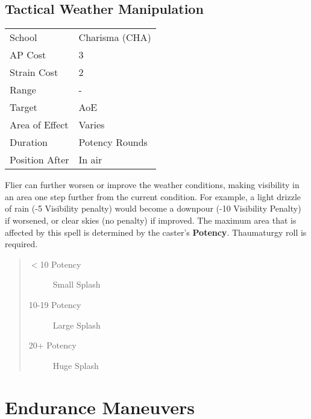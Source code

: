 \documentclass[11pt,a4paper,twocolumn]{book}
\begin{document}
\subsection*{Tactical Weather Manipulation}
{
	\begin{tabu} to 75mm{| X[l,4] | X[l,7] |}
		\hline
		School 			& Charisma (CHA) 	\\
		AP Cost	      	& 3 				\\
		Strain Cost     & 2 				\\
		Range     		& - 				\\
		Target      	& AoE 				\\
		Area of Effect  & Varies 	 		\\
		Duration     	& Potency Rounds	\\
		Position After  & In air 			\\ \hline
	\end{tabu}
	
}

\medskip

Flier can further worsen or improve the weather conditions, making visibility in an area one step further from the current condition. For example, a light drizzle of rain (-5 Visibility penalty) would become a downpour (-10 Visibility Penalty) if worsened, or clear skies (no penalty) if improved. The maximum area that is affected by this spell is determined by the caster's \textbf{Potency}. Thaumaturgy roll is required. 

\begin{quote}
	\begin{description}
		\item[$<$10 Potency] 	Small Splash
		\item[10-19 Potency] 	Large Splash
		\item[20+ Potency] 	Huge Splash
	\end{description}
\end{quote}

\vfill



\section*{Endurance Maneuvers}
\end{document}
